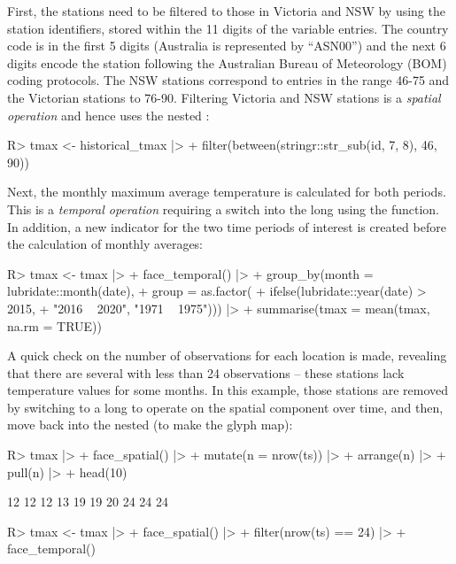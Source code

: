 \documentclass[
  shortnames]{jss}
\begin{document}
First, the stations need to be filtered to those in Victoria and NSW by using the station identifiers, stored within the 11 digits of the  variable entries. The country code is in the first 5 digits (Australia is represented by ``ASN00'') and the next 6 digits encode the station following the Australian Bureau of Meteorology (BOM) \citep{bom} coding protocols. The NSW stations correspond to entries in the range 46-75 and the Victorian stations to 76-90. Filtering Victoria and NSW stations is a \emph{spatial operation} and hence uses the nested :

\begin{CodeChunk}
\begin{CodeInput}
R> tmax <- historical_tmax |>
+   filter(between(stringr::str_sub(id, 7, 8), 46, 90))
\end{CodeInput}
\end{CodeChunk}

Next, the monthly maximum average temperature is calculated for both periods. This is a \emph{temporal operation} requiring a switch into the long  using the  function. In addition, a new indicator for the two time periods of interest is created before the calculation of monthly averages:

\begin{CodeChunk}
\begin{CodeInput}
R> tmax <- tmax |>
+   face_temporal() |> 
+   group_by(month = lubridate::month(date),
+          group = as.factor(
+            ifelse(lubridate::year(date) > 2015,
+            "2016 ~ 2020", "1971 ~ 1975"))) |>
+   summarise(tmax = mean(tmax, na.rm = TRUE))
\end{CodeInput}
\end{CodeChunk}

A quick check on the number of observations for each location is made, revealing that there are several with less than 24 observations -- these stations lack temperature values for some months. In this example, those stations are removed by switching to a long  to operate on the spatial component over time, and then, move back into the nested  (to make the glyph map):

\begin{CodeChunk}
\begin{CodeInput}
R> tmax |> 
+   face_spatial() |> 
+   mutate(n = nrow(ts)) |>
+   arrange(n) |>
+   pull(n) |> 
+   head(10)
\end{CodeInput}
\begin{CodeOutput}
 [1] 12 12 12 13 19 19 20 24 24 24
\end{CodeOutput}
\begin{CodeInput}
R> tmax <- tmax |> 
+   face_spatial() |> 
+   filter(nrow(ts) == 24) |>
+   face_temporal()
\end{CodeInput}
\end{CodeChunk}
\end{document}
